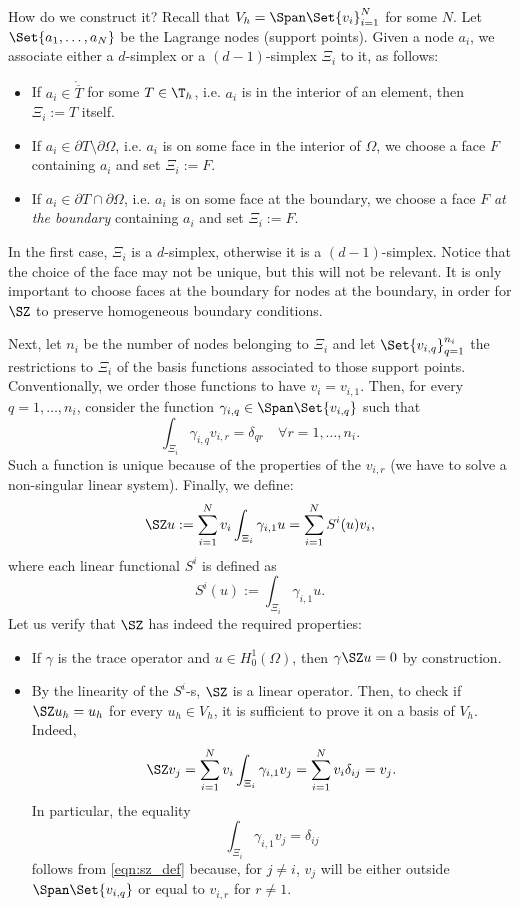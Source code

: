 How do we construct it? Recall that $V_h = \Span\Set{v_i}_{i=1}^N$ for some $N$. Let $\Set{a_1, \dots , a_N}$ be the Lagrange nodes (support points).
Given a node $a_i$, we associate either a $d$-simplex or a $(d-1)$-simplex $\Xi_i$ to it, as follows:
\begin{itemize}
    \item If $a_i \in \mathring{\overline{T}}$ for some $T \in \T_h$, i.e. $a_i$ is in the interior of an element, then $\Xi_i := T$ itself.
    \item If $a_i \in \partial T \setminus \partial \Omega$, i.e. $a_i$ is on some face in the interior of $\Omega$, we choose a face $F$ containing $a_i$ and set $\Xi_i := F$.
    \item If $a_i \in \partial T \cap \partial \Omega$, i.e. $a_i$ is on some face at the boundary, we choose a face $F$ \emph{at the boundary} containing $a_i$ and set $\Xi_i := F$.
\end{itemize}
In the first case, $\Xi_i$ is a $d$-simplex, otherwise it is a $(d-1)$-simplex. Notice that the choice of the face may not be unique, but this will not be relevant. It is only important to choose faces at the boundary for nodes at the boundary, in order for $\SZ$ to preserve homogeneous boundary conditions.

Next, let $n_i$ be the number of nodes belonging to $\Xi_i$ and let $\Set{v_{i,q}}_{q=1}^{n_i}$ the restrictions to $\Xi_i$ of the basis functions associated to those support points. Conventionally, we order those functions to have $v_i = v_{i,1}$. Then, for every $q=1,\dots,n_i$, consider the function $\gamma_{i,q} \in \Span\Set{v_{i,q}}$ such that
\begin{equation}\label{eqn:sz_def}
    \int_{\Xi_i} \gamma_{i,q} v_{i,r} = \delta_{qr} \quad \forall r=1,\dots,n_i.
\end{equation}
Such a function is unique because of the properties of the $v_{i,r}$ (we have to solve a non-singular linear system). Finally, we define:
\[
\SZ u := \sum_{i=1}^N v_i \int_{\Xi_i} \gamma_{i,1} u = 
\sum_{i=1}^N S^i(u) v_i,
\]
where each linear functional $S^i$ is defined as
\[
S^i(u) := \int_{\Xi_i} \gamma_{i,1} u.
\]
Let us verify that $\SZ$ has indeed the required properties:
\begin{itemize}
    \item If $\gamma$ is the trace operator and $u \in H^1_0(\Omega)$, then $\gamma \SZ u = 0$ by construction.
    \item By the linearity of the $S^i$-s, $\SZ$ is a linear operator. Then, to check if $\SZ u_h = u_h$ for every $u_h \in V_h$, it is sufficient to prove it on a basis of $V_h$. Indeed,
    \[
        \SZ v_j = \sum_{i=1}^N v_i \int_{\Xi_i} \gamma_{i,1} v_j = \sum_{i=1}^N v_i \delta_{ij} = v_j.
    \]
    In particular, the equality
    \[
    \int_{\Xi_i} \gamma_{i,1} v_j = \delta_{ij}
    \]
    follows from \eqref{eqn:sz_def} because, for $j \ne i$, $v_j$ will be either outside $\Span\Set{v_{i,q}}$ or equal to $v_{i,r}$ for $r \ne 1$.
\end{itemize}

